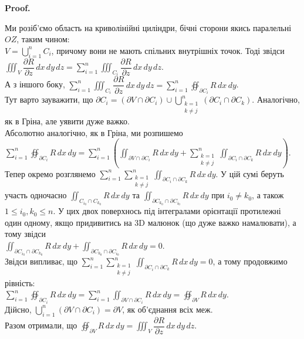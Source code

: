 \documentclass[a4paper, 10pt]{article}
\makeatletter
\def\departial#1#2{\dfrac{\partial {#1}}{\partial {#2}}}
\def\qed{$\blacksquare$}
\theoremstyle{theoremdd}
\theoremstyle{theoremdd}
\theoremstyle{theoremdd}
\theoremstyle{theoremdd}
\theoremstyle{theoremdd}
\theoremstyle{theoremdd}
\theoremstyle{theoremdd}
\theoremstyle{theoremdd}
\theoremstyle{theoremdd}
\theoremstyle{theoremdd}
\theoremstyle{theoremdd}
\theoremstyle{theoremdd}
\theoremstyle{theoremdd}
\theoremstyle{theoremdd}
\theoremstyle{theoremdd}
\renewenvironment{proof}[1][Proof.\\]{\par
\pushQED{\hfill \qed}%
\normalfont \topsep6\p@\@plus6\p@\relax
\trivlist
\item\relax
{\bfseries
#1\@addpunct{.}}\hspace\labelsep\ignorespaces
}{%
\popQED\endtrivlist\@endpefalse
}
\makeatother
\begin{document}
\begin{proof}
Ми розіб'ємо область на криволінійні циліндри, бічні сторони якись паралельні $OZ$, таким чином:\\
$V = \displaystyle\bigcup_{i=1}^n C_i$, причому вони не мають спільних внутрішніх точок. Тоді звідси\\
$\displaystyle\iiint_V \departial{R}{z}\,dx\,dy\,dz = \sum_{i=1}^n \iiint_{C_i} \departial{R}{z}\,dx\,dy\,dz$.\\
А з іншого боку, $\displaystyle\sum_{i=1}^n \iiint_{C_i} \departial{R}{z}\,dx\,dy\,dz = \sum_{i=1}^n\oiint_{\partial C_i} R\,dx\,dy$.\\
Тут варто зауважити, що $\partial C_i = (\partial V \cap \partial C_i) \cup \displaystyle\bigcup_{\substack{k = 1 \\ k \neq j}}^n (\partial C_i \cap \partial C_k)$. Аналогічно, як в Гріна, але уявити дуже важко.\\
Абсолютно аналогічно, як в Гріна, ми розпишемо\\
$\displaystyle\sum_{i=1}^n\oiint_{\partial C_i} R\,dx\,dy = \sum_{i=1}^n \left( \iint_{\partial V \cap \partial C_i}R\,dx\,dy + \sum_{\substack{k = 1 \\ k \neq j}}^n \iint_{\partial C_i \cap \partial C_k}R\,dx\,dy \right)$.\\
Тепер окремо розглянемо $\displaystyle\sum_{i=1}^n \sum_{\substack{k=1 \\ k \neq j}}^n \iint_{\partial C_i \cap \partial C_k} R\,dx\,dy$. У цій сумі беруть участь одночасно $\displaystyle\iint_{C_{i_0} \cap C_{k_0}} R\,dx\,dy$ та $\displaystyle\iint_{\partial C_{k_0} \cap \partial C_{i_0}} R\,dx\,dy$ при $i_0 \neq k_0$, а також $1 \leq i_0,k_0 \leq n$. У цих двох поверхнось під інтегралами орієнтації протилежні один одному, якщо придивитись на 3D малюнок (що дуже важко намалювати), а тому звідси\\
$\displaystyle\iint_{\partial C_{i_0} \cap \partial C_{k_0}} R\,dx\,dy + \iint_{\partial C_{k_0} \cap \partial C_{i_0}} R\,dx\,dy = 0$.\\
Звідси випливає, що $\displaystyle\sum_{i=1}^n \sum_{\substack{k=1 \\ k \neq j}}^n \iint_{\partial C_i \cap \partial C_k} R\,dx\,dy = 0$, а тому продовжимо рівність:\\
$\displaystyle\sum_{i=1}^n \oiint_{\partial C_i} R\,dx\,dy = \sum_{i=1}^n \iint_{\partial V \cap \partial C_i} R\,dx\,dy = \oiint_{\partial V} R\,dx\,dy$.\\
Дійсно, $\displaystyle\bigcup_{i=1}^n (\partial V \cap \partial C_i) = \partial V$, як об'єднання всіх меж.\\
Разом отримали, що $\displaystyle\oiint_{\partial V}R\,dx\,dy = \iiint_V \departial{R}{z}\,dx\,dy\,dz$.
\end{proof}
\end{document}
